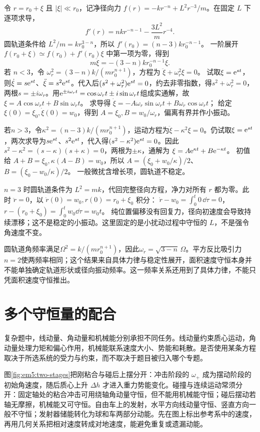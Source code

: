 令 $r=r_0+\xi$ 且 $|\xi|\ll r_0$，记净径向力
$f(r)=-kr^{-n}+L^2r^{-3}/m$。在固定 $L$ 下逐项求导，
\[
f'(r)=nk r^{-n-1}-\frac{3L^2}{m}r^{-4}.
\]
圆轨道条件给 $L^2/m=kr_0^{3-n}$，所以
$f'(r_0)=(n-3)kr_0^{-n-1}$。
一阶展开 $f(r_0+\xi)\simeq f(r_0)+f'(r_0)\xi$ 中第一项为零，得到
\[m\ddot\xi=-(3-n)k r_0^{-n-1}\xi.\]
若 $n<3$，令 $\omega_r^2=(3-n)k/(mr_0^{n+1})$，方程为 $\ddot\xi+\omega_r^2\xi=0$。
试取$\xi=\mathrm e^{st}$，则$\dot\xi=s\mathrm e^{st}$、$\ddot\xi=s^2\mathrm e^{st}$。代入后$(s^2+\omega_r^2)\mathrm e^{st}=0$，约去非零指数，得$s^2+\omega_r^2=0$，两根$s=\pm i\omega_r$。用$\mathrm e^{\pm i\omega_rt}=\cos\omega_rt\pm i\sin\omega_rt$组成实通解，故
$\xi=A\cos\omega_rt+B\sin\omega_rt$。
求导得 $\dot\xi=-A\omega_r\sin\omega_rt+B\omega_r\cos\omega_rt$；
给定 $\xi(0)=\xi_0,\dot\xi(0)=w_0$，得到
$A=\xi_0,B=w_0/\omega_r$，偏离有界并作小振动。

若$n>3$，令$\kappa^2=(n-3)k/(mr_0^{n+1})$，运动方程为$\ddot\xi-\kappa^2\xi=0$。仍试取$\xi=\mathrm e^{st}$，两次求导为$s\mathrm e^{st}$、$s^2\mathrm e^{st}$，代入得$(s^2-\kappa^2)\mathrm e^{st}=0$。因此$s^2-\kappa^2=(s-\kappa)(s+\kappa)=0$，两根为$\pm\kappa$，通解为
$\xi=A\mathrm e^{\kappa t}+B\mathrm e^{-\kappa t}$。
初值给 $A+B=\xi_0,\kappa(A-B)=w_0$，所以
$A=(\xi_0+w_0/\kappa)/2$、$B=(\xi_0-w_0/\kappa)/2$。
一般微扰含增长项，圆轨道不稳定。

$n=3$ 时圆轨道条件为 $L^2=mk$，代回完整径向方程，净力对所有 $r$ 都为零。此时 $\ddot r=0$，以 $\dot r(0)=w_0,r(0)=r_0+\xi_0$ 积分：
$\dot r-w_0=\int_0^t0\,\dd\tau=0$，
$r-(r_0+\xi_0)=\int_0^tw_0\dd\tau=w_0t$。
纯位置偏移没有回复力，径向初速度会导致持续漂移；这不是稳定的小振动。这里固定的是小扰动过程中守恒的 $L$，不是强令角速度不变。



圆轨道角频率满足$\Omega^2=k/(mr_0^{n+1})$，因此$\omega_r=\sqrt{3-n}\,\Omega$。平方反比吸引力$n=2$使两频率相同；这个结果来自具体力律与稳定性展开，面积速度守恒本身并不能单独确定轨道形状或径向振动频率。这一频率关系还用到了具体力律，不能只凭面积速度守恒推出。

\section{多个守恒量的配合}

复杂题中，线动量、角动量和机械能分别承担不同任务。线动量约束质心运动，角动量处理力矩和偏心作用，机械能联系速度大小、势能和耗散。是否使用某条方程取决于所选系统的受力与约束，而不取决于题目被归入哪个专题。

图\ref{fig:em5:two-stages}把刚粘合与碰后上摆分开：冲击阶段的 $\omega_+$ 成为摆动阶段的初始角速度，随后质心上升 $\Delta h$ 才进入重力势能变化。碰撞与连续运动常须分开：固定轴处的粘合冲击可用绕轴角动量守恒，但不能用机械能守恒；碰后摆动若轴无摩擦，机械能又可守恒。自由车上的发射，水平方向线动量守恒、竖直方向一般不守恒；发射器储能转化为球和车两部分动能。先在图上标出参考系中的速度，再用几何关系把相对速度转成对地速度，能避免重复或遗漏动能。

